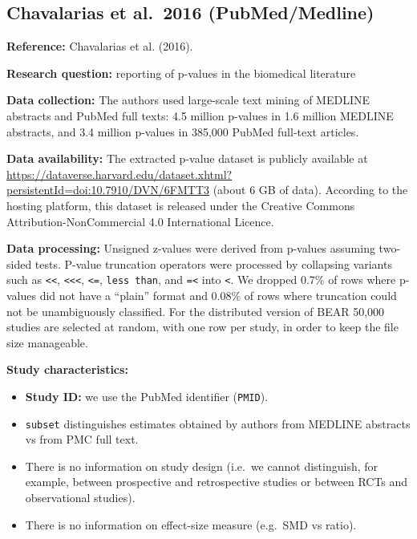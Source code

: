 \documentclass[
  11pt,
]{article}
\providecommand{\tightlist}{%
  \setlength{\itemsep}{0pt}\setlength{\parskip}{0pt}}
\begin{document}
\newpage

\subsection{Chavalarias et al.~2016
(PubMed/Medline)}\label{chavalarias-et-al.-2016-pubmedmedline}

\textbf{Reference:} Chavalarias et al. (2016).

\textbf{Research question:} reporting of p-values in the biomedical
literature

\textbf{Data collection:} The authors used large-scale text mining of
MEDLINE abstracts and PubMed full texts: 4.5 million p-values in 1.6
million MEDLINE abstracts, and 3.4 million p-values in 385,000 PubMed
full-text articles.

\textbf{Data availability:} The extracted p-value dataset is publicly
available at
\url{https://dataverse.harvard.edu/dataset.xhtml?persistentId=doi:10.7910/DVN/6FMTT3}
(about 6 GB of data). According to the hosting platform, this dataset is
released under the Creative Commons Attribution-NonCommercial 4.0
International Licence.

\textbf{Data processing:} Unsigned z-values were derived from p-values
assuming two-sided tests. P-value truncation operators were processed by
collapsing variants such as \texttt{\textless{}\textless{}},
\texttt{\textless{}\textless{}\textless{}}, \texttt{\textless{}=},
\texttt{less\ than}, and \texttt{=\textless{}} into
\texttt{\textless{}}. We dropped 0.7\% of rows where p-values did not
have a ``plain'' format and 0.08\% of rows where truncation could not be
unambiguously classified. For the distributed version of BEAR 50,000
studies are selected at random, with one row per study, in order to keep
the file size manageable.

\textbf{Study characteristics:}

\begin{itemize}
\tightlist
\item
  \textbf{Study ID:} we use the PubMed identifier (\texttt{PMID}).
\item
  \texttt{subset} distinguishes estimates obtained by authors from
  MEDLINE abstracts vs from PMC full text.
\item
  There is no information on study design (i.e.~we cannot distinguish,
  for example, between prospective and retrospective studies or between
  RCTs and observational studies).
\item
  There is no information on effect-size measure (e.g.~SMD vs ratio).
\end{itemize}
\end{document}
